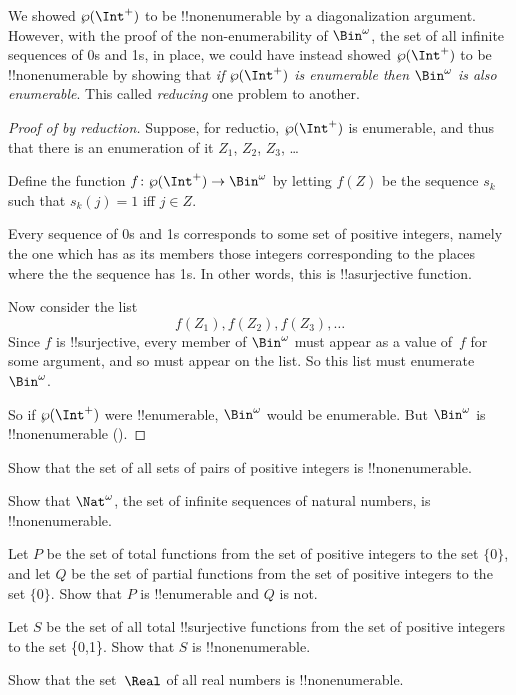\documentclass[../../include/open-logic-section]{subfiles}
\begin{document}


We showed $\Pow{\Int^+}$ to be !!{nonenumerable} by a diagonalization
argument. However, with the proof of the non-enumerability of
$\Bin^\omega$, the set of all infinite sequences of 0s and 1s, in
place, we could have instead showed $\Pow{\Int^+}$ to be
!!{nonenumerable} by showing that \emph{if $\Pow{\Int^+}$ is
  enumerable then $\Bin^\omega$ is also enumerable}. This called
\emph{reducing} one problem to another.

\begin{proof}[Proof of {} by reduction]
Suppose, for reductio, $\Pow{\Int^+}$ is enumerable, and thus that
there is an enumeration of it $Z_{1}$, $Z_{2}$, $Z_{3}$, \dots

Define the function $f \colon \Pow{\Int^+} \to \Bin^\omega$ by letting
$f(Z)$ be the sequence $s_{k}$ such that $s_{k}(j) = 1$ iff $j \in Z$.

Every sequence of 0s and 1s corresponds to some set of positive
integers, namely the one which has as its members those integers
corresponding to the places where the the sequence has 1s. In other
words, this is !!a{surjective} function.

Now consider the list 
\[
f(Z_1), f(Z_2), f(Z_3), \dots
\]
Since $f$ is !!{surjective}, every member of $\Bin^\omega$ must
appear as a value of~$f$ for some argument, and so must appear on the
list. So this list must enumerate~$\Bin^\omega$.

So if $\Pow{\Int^+}$ were !!{enumerable}, $\Bin^\omega$ would be enumerable.
But $\Bin^\omega$ is !!{nonenumerable} ().
\end{proof}

\begin{prob}
Show that the set of all sets of pairs of positive integers is
!!{nonenumerable}.
\end{prob}

\begin{prob}
Show that $\Nat^\omega$, the set of infinite sequences of
natural numbers, is !!{nonenumerable}.
\end{prob}

\begin{prob}
Let $P$ be the set of total functions from the set of positive
integers to the set $\{0\}$, and let $Q$ be the set of partial
functions from the set of positive integers to the set $\{0\}$. Show
that $P$ is !!{enumerable} and $Q$ is not.
\end{prob}

\begin{prob}
Let $S$ be the set of all total !!{surjective} functions from the set
of positive integers to the set \{0,1\}. Show that $S$ is
!!{nonenumerable}.
\end{prob}

\begin{prob}
Show that the set~$\Real$ of all real numbers is !!{nonenumerable}.
\end{prob}
\end{document}
